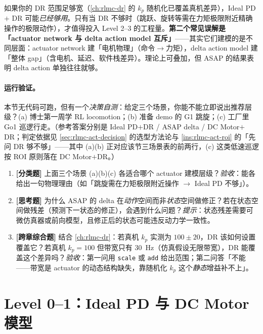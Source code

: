 \begin{insight}\label{ins:rlmc-act-notalways}
如果你的 DR 范围足够宽（\cref{ch:rlmc-dr} 的 $k_p$ 随机化已覆盖真机差异），Ideal PD $+$ DR 可能\emph{已经够用}。只有当 DR 不够时（跳跃、旋转等需在力矩极限附近精确操作的极限动作），才值得投入 Level 2--3 的工程量。\textbf{第二个常见误解是「actuator network 与 delta action model 互斥」}——其实它们建模的是不同层面：actuator network 建「电机物理」（命令$\to$力矩），delta action model 建「整体 gap」（含电机、延迟、软件栈差异）。理论上可叠加，但 ASAP 的结果表明 delta action 单独往往就够。
\end{insight}

\paragraph{运行验证。}本节无代码可跑，但有一个\emph{决策自测}：给定三个场景，你能不能立即说出推荐层级？(a) 博士第一周学 RL locomotion；(b) 准备 demo 的 G1 跳旋；(c) 工厂里 Go1 巡逻行走。（参考答案分别是 Ideal PD$+$DR / ASAP delta / DC Motor$+$DR；判定依据见 \cref{sec:rlmc-act-decision} 的选型方法论与 \cref{ins:rlmc-act-roi} 的「先问 DR 够不够」——其中 (a)(b) 正对应该节三场景表的前两行，(c) 这类低速巡逻按 ROI 原则落在 DC Motor$+$DR。）

\begin{practice}[本节练习]
\begin{enumerate}
  \item \textbf{[分类题]} 上面三个场景 (a)(b)(c) 各适合哪个 actuator 建模层级？\emph{验收}：能各给出一句物理理由（如「跳旋需在力矩极限附近操作 $\to$ Ideal PD 不够」）。
  \item \textbf{[思考题]} 为什么 ASAP 的 delta 在\emph{动作}空间而非\emph{状态}空间做修正？若在状态空间做残差（预测下一状态的修正），会遇到什么问题？\emph{提示}：状态残差需要可微仿真器或前向模型，且修正后的状态可能违反动力学一致性。
  \item \textbf{[跨章综合题]} 结合 \cref{ch:rlmc-dr}：若真机 $k_p$ 实测为 $100\pm20$，DR 该如何设置覆盖它？若真机 $k_p=100$ 但带宽只有 30~Hz（仿真假设无限带宽），DR 能覆盖这个差异吗？\emph{验收}：第一问用 \verb|scale| 或 \verb|add| 给出范围；第二问答「不能——带宽是 actuator 的动态结构缺失，靠随机化 $k_p$ 这个\emph{静态}增益补不上」。
\end{enumerate}
\end{practice}

\section{Level 0--1：Ideal PD 与 DC Motor 模型}
\label{sec:rlmc-act-level01}

